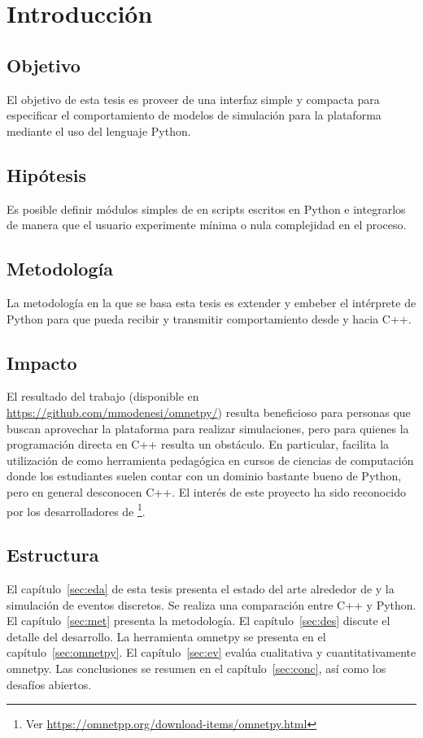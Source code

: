 \chapter{Introducción}
\section{Objetivo}

El objetivo de esta tesis es proveer de una interfaz simple y compacta para
especificar el comportamiento de modelos de simulación para la plataforma
\omnetpp{} mediante el uso del lenguaje Python.

\section{Hipótesis}

Es posible definir módulos simples de \omnetpp{} en scripts escritos en Python e
integrarlos de manera que el usuario experimente mínima o nula complejidad en el
proceso.

\section{Metodología}

La metodología en la que se basa esta tesis es extender y embeber el intérprete
de Python para que pueda recibir y transmitir comportamiento desde y hacia C++.

\section{Impacto}

El resultado del trabajo (disponible en \url{https://github.com/mmodenesi/omnetpy/})
resulta beneficioso para personas que buscan aprovechar la plataforma \omnetpp{}
para realizar simulaciones, pero para quienes la programación directa en C++
resulta un obstáculo. En particular, facilita la utilización de \omnetpp{} como
herramienta pedagógica en cursos de ciencias de computación donde los
estudiantes suelen contar con un dominio bastante bueno de Python, pero en
general desconocen C++.  El interés de este proyecto ha sido reconocido por los
desarrolladores de \omnetpp{} \footnote{Ver \url{https://omnetpp.org/download-items/omnetpy.html}}.

\section{Estructura}

El capítulo~\ref{sec:eda} de esta tesis presenta el estado del arte alrededor
de \omnetpp{} y la simulación de eventos discretos. Se realiza una comparación
entre C++ y Python. El capítulo~\ref{sec:met} presenta la metodología. El
capítulo~\ref{sec:des} discute el detalle del desarrollo. La herramienta
omnetpy se presenta en el capítulo~\ref{sec:omnetpy}. El capítulo~\ref{sec:ev}
evalúa cualitativa y cuantitativamente omnetpy. Las conclusiones se resumen en
el capítulo~\ref{sec:conc}, así como los desafíos abiertos.
